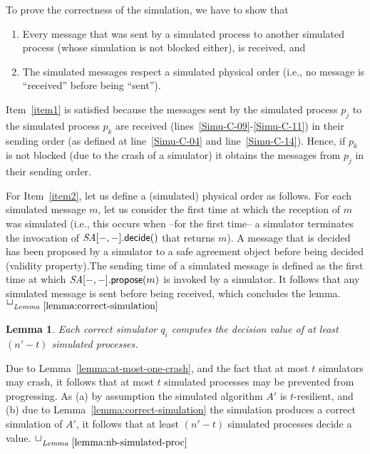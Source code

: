 \documentclass[11pt,letterpaper]{article}
\newtheorem{lemma}{Lemma}
\newlength {\afterproof}
\newcommand{\toto}{xxx}
\newenvironment{proofL}{\noindent{\bf Proof }}
{\hspace*{\fill}$\Box_{\mathit{Lemma}~\ref{\toto}}$\par\vspace{\afterproof}}
\newcommand{\SA}{\mathit{SA}}
\begin{document}
\begin{proofL}
To prove the correctness of the simulation, we have  to show that
\begin{enumerate}
\vspace{-0.2cm}
\item
\label{item1}
Every message that was sent by a simulated process to another simulated
process (whose simulation is not blocked either), is received, and
\vspace{-0.2cm}
\item
\label{item2}
The simulated messages respect a simulated physical order
(i.e., no message is ``received'' before being  ``sent'').
\end{enumerate}

Item~\ref{item1} is satisfied because the messages sent by
the simulated process $p_j$ to the simulated process $p_k$ are received
(lines~\ref{Simu-C-09}-\ref{Simu-C-11}) in their sending order
(as defined at line~\ref{Simu-C-04}  and line~\ref{Simu-C-14}).
Hence, if $p_k$ is not blocked (due to the crash of a simulator)
it obtains the messages from $p_j$ in their sending order.


For Item~\ref{item2}, let us define a (simulated) physical order as follows.
For each simulated message $m$, let us consider the first time at which the
reception of $m$  was simulated (i.e., this occurs when
 --for the first time-- a simulator terminates  the invocation  of
$\SA[-,-].{\sf decide}()$  that returns $m$).
A message that is decided has been proposed by a simulator to a safe agreement
object before  being decided (validity property).The  sending time of  a
simulated message is defined as  the first time at which
$\SA[-,-].{\sf propose}(m)$ is  invoked by a simulator.
It follows that any simulated  message is sent before being received,
which concludes the lemma.
\renewcommand{\toto}{lemma:correct-simulation}
\end{proofL}


\begin{lemma}
\label{lemma:nb-simulated-proc}
Each correct simulator $q_i$ computes the decision value of
at least $(n'-t)$ simulated processes.
\end{lemma}

\begin{proofL}
Due to Lemma~\ref{lemma:at-most-one-crash}, and the fact that at most $t$
simulators may crash, it follows that at most $t$ simulated processes may be
prevented from progressing. As (a) by assumption the simulated algorithm $A'$
is $t$-resilient, and (b) due to Lemma~\ref{lemma:correct-simulation}
the simulation produces a correct simulation of $A'$, it follows that at
least $(n'-t)$ simulated processes decide a value.
\renewcommand{\toto}{lemma:nb-simulated-proc}
\end{proofL}
\end{document}
